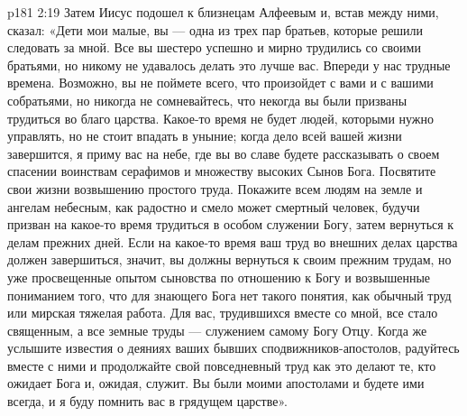 \vs p181 2:19 \pc Затем Иисус подошел к близнецам Алфеевым и, встав между ними, сказал: «Дети мои малые, вы --- одна из трех пар братьев, которые решили следовать за мной. Все вы шестеро успешно и мирно трудились со своими братьями, но никому не удавалось делать это лучше вас. Впереди у нас трудные времена. Возможно, вы не поймете всего, что произойдет с вами и с вашими собратьями, но никогда не сомневайтесь, что некогда вы были призваны трудиться во благо царства. Какое\hyp{}то время не будет людей, которыми нужно управлять, но не стоит впадать в уныние; когда дело всей вашей жизни завершится, я приму вас на небе, где вы во славе будете рассказывать о своем спасении воинствам серафимов и множеству высоких Сынов Бога. Посвятите свои жизни возвышению простого труда. Покажите всем людям на земле и ангелам небесным, как радостно и смело может смертный человек, будучи призван на какое\hyp{}то время трудиться в особом служении Богу, затем вернуться к делам прежних дней. Если на какое\hyp{}то время ваш труд во внешних делах царства должен завершиться, значит, вы должны вернуться к своим прежним трудам, но уже просвещенные опытом сыновства по отношению к Богу и возвышенные пониманием того, что для знающего Бога нет такого понятия, как обычный труд или мирская тяжелая работа. Для вас, трудившихся вместе со мной, все стало священным, а все земные труды --- служением самому Богу Отцу. Когда же услышите известия о деяниях ваших бывших сподвижников\hyp{}апостолов, радуйтесь вместе с ними и продолжайте свой повседневный труд как это делают те, кто ожидает Бога и, ожидая, служит. Вы были моими апостолами и будете ими всегда, и я буду помнить вас в грядущем царстве».
